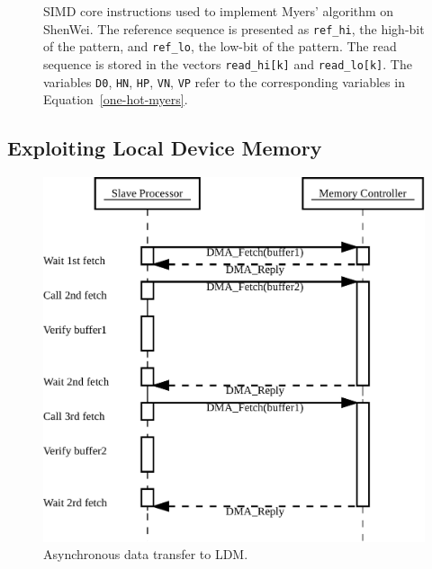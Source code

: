 \documentclass[conference]{IEEEtran}
\begin{document}
\begin{figure}[!htb]
	\caption{SIMD core instructions used to implement Myers' algorithm on ShenWei. The reference sequence is presented as \texttt{ref\_hi}, the high-bit of the pattern, and \texttt{ref\_lo}, the low-bit of the pattern. The read sequence is stored in the vectors \texttt{read\_hi[k]} and \texttt{read\_lo[k]}. The variables \texttt{D0}, \texttt{HN}, \texttt{HP}, \texttt{VN}, \texttt{VP} refer to the corresponding variables in Equation~\ref{one-hot-myers}.}
	\label{cores}
\end{figure}

\subsection{Exploiting Local Device Memory}

\begin{figure}[!htb]
	\includegraphics[width=1\linewidth]{AsyncTrans}
	\caption{Asynchronous data transfer to LDM.}
	\label{AsyncTrans}
\end{figure}
\end{document}
